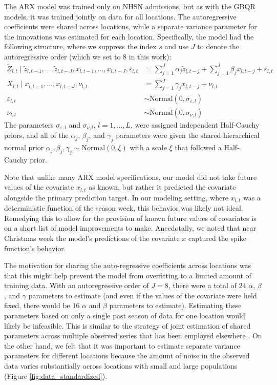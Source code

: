 \documentclass{article}\usepackage[]{graphicx}\usepackage[]{xcolor}
\begin{document}
The ARX model was trained only on NHSN admissions, but as with the GBQR models, it was trained jointly on data for all locations. The autoregressive coefficients were shared across locations, while a separate variance parameter for the innovations was estimated for each location. Specifically, the model had the following structure, where we suppress the index $s$ and use $J$ to denote the autoregressive order (which we set to 8 in this work):
\begin{align*}
\tilde{Z}_{l,t} \mid \tilde{z}_{l, t - 1}, \ldots, \tilde{z}_{l, t - J}, x_{l, t - 1}, \ldots, x_{l, t - J}, \varepsilon_{l,t} &= \sum_{j = 1}^J \alpha_j \tilde{z}_{l, t - j} + \sum_{j = 1}^J \beta_j x_{l, t - j} + \varepsilon_{l, t} \\
X_{l,t} \mid x_{l, t - 1}, \ldots, x_{l, t - J}, \nu_{l, t} &= \sum_{j = 1}^J \gamma_j x_{l, t - j} + \nu_{l, t} \\
\varepsilon_{l, t} &\sim \text{Normal}(0, \sigma_{\varepsilon, l}) \\
\nu_{l, t} &\sim \text{Normal}(0, \sigma_{\nu, l})
\end{align*}
The parameters $\sigma_{\varepsilon, l}$ and $\sigma_{\nu, l}$, $l = 1, \ldots, L$, were assigned independent Half-Cauchy priors, and all of the $\alpha_j$, $\beta_j$, and $\gamma_j$ parameters were given the shared hierarchical normal prior $\alpha_j, \beta_j, \gamma_j \sim \text{Normal}(0, \xi)$ with a scale $\xi$ that followed a Half-Cauchy prior.

Note that unlike many ARX model specifications, our model did not take future values of the covariate $x_{l,t}$ as known, but rather it predicted the covariate alongside the primary prediction target. In our modeling setting, where $x_{l, t}$ was a deterministic function of the season week, this behavior was likely not ideal. Remedying this to allow for the provision of known future values of covariates is on a short list of model improvements to make. Anecdotally, we noted that near Christmas week the model's predictions of the covariate $x$ captured the spike function's behavior.

The motivation for sharing the auto-regressive coefficients across locations was that this might help prevent the model from overfitting to a limited amount of training data.  With an autoregressive order of $J=8$, there were a total of 24 $\alpha$, $\beta$, and $\gamma$ parameters to estimate (and even if the values of the covariate were held fixed, there would be 16 $\alpha$ and $\beta$ parameters to estimate).  Estimating these parameters based on only a single past season of data for one location would likely be infeasible.  This is similar to the strategy of joint estimation of shared parameters across multiple observed series that has been employed elsewhere \cite[e.g., ][]{Montero2021localglobalforecast}. On the other hand, we felt that it was important to estimate separate variance parameters for different locations because the amount of noise in the observed data varies substantially across locations with small and large populations (Figure \ref{fig:data_standardized}).
\end{document}
